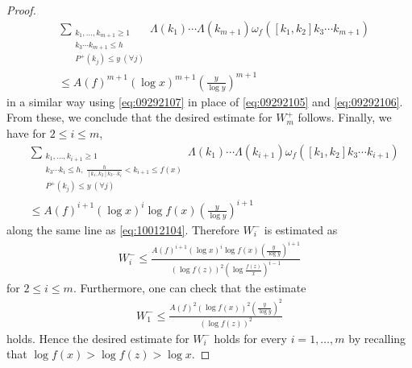 \documentclass[a4paper,11pt]{amsart}
\theoremstyle{definition}
\numberwithin{equation}{section}
\begin{document}
\begin{proof}
\begin{align}
&\sum_{\substack{k_1,\ldots,k_{m+1} \geq 1 \\ [k_1,k_2]k_3 \cdots k_{m+1} \leq h \\ P^+(k_j) \leq y ~(\forall j)}} 
\Lambda(k_1) \cdots \Lambda(k_{m+1}) \omega_f([k_1,k_2] k_3 \cdots k_{m+1}) \\
&\leq A(f)^{m+1} (\log{x})^{m+1} \left(\frac{y}{\log{y}}\right)^{m+1} \nonumber
\end{align}
in a similar way using \eqref{eq:09292107} in place of \eqref{eq:09292105} and \eqref{eq:09292106}. 
From these, we conclude that the desired estimate for $W_m^+$ follows. 
Finally, we have for $2 \leq i \leq m$, 
\begin{align*}
&\sum_{\substack{k_1,\ldots,k_{i+1} \geq 1 \\ [k_1,k_2]k_3 \cdots k_i \leq h,~ \frac{h}{[k_1,k_2]k_3 \cdots k_i}<k_{i+1} \leq f(x) \\ P^+(k_j) \leq y ~(\forall j)}} 
\Lambda(k_1) \cdots \Lambda(k_{i+1}) \omega_f([k_1,k_2] k_3 \cdots k_{i+1}) \\
&\leq A(f)^{i+1} (\log{x})^i \log{f(x)} \left(\frac{y}{\log{y}}\right)^{i+1} 
\end{align*}
along the same line as \eqref{eq:10012104}. 
Therefore $W_i^-$ is estimated as
\begin{align*}
W_i^-
\leq \frac{A(f)^{i+1} (\log{x})^i \log{f(x)} \left(\frac{y}{\log{y}}\right)^{i+1}}{(\log{f(z)})^2 \left(\log{\frac{f(z)}{x}}\right)^{i-1}} 
\end{align*}
for $2 \leq i \leq m$. 
Furthermore, one can check that the estimate
\begin{align*}
W_1^-
\leq \frac{A(f)^{2} (\log{f(x)})^2 \left(\frac{y}{\log{y}}\right)^2}{(\log{f(z)})^2}
\end{align*}
holds. 
Hence the desired estimate for $W_i^-$ holds for every $i=1,\ldots,m$ by recalling that $\log{f(x)}>\log{f(z)}>\log{x}$. 
\end{proof}
\end{document}
